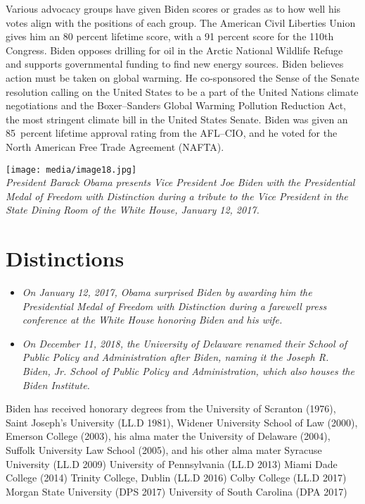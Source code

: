 Various advocacy groups have given Biden scores or grades as to how well
his votes align with the positions of each group. The American Civil
Liberties Union gives him an 80 percent lifetime score, with a 91
percent score for the 110th Congress. Biden opposes drilling for oil in
the Arctic National Wildlife Refuge and supports governmental funding to
find new energy sources. Biden believes action must be taken on global
warming. He co-sponsored the Sense of the Senate resolution calling on
the United States to be a part of the United Nations climate
negotiations and the Boxer--Sanders Global Warming Pollution Reduction
Act, the most stringent climate bill in the United States Senate. Biden
was given an 85~percent lifetime approval rating from the AFL--CIO, and
he voted for the North American Free Trade Agreement (NAFTA).

\texttt{[image: media/image18.jpg]}\\
\emph{President Barack Obama presents Vice President Joe Biden with the
Presidential Medal of Freedom with Distinction during a tribute to the
Vice President in the State Dining Room of the White House, January 12,
2017.}

\section{Distinctions}\label{distinctions}

\begin{itemize}
\item
  \emph{On January 12, 2017, Obama surprised Biden by awarding him the
  Presidential Medal of Freedom with Distinction during a farewell press
  conference at the White House honoring Biden and his wife.}
\item
  \emph{On December 11, 2018, the University of Delaware renamed their
  School of Public Policy and Administration after Biden, naming it the
  Joseph R. Biden, Jr. School of Public Policy and Administration, which
  also houses the Biden Institute.}
\end{itemize}

Biden has received honorary degrees from the University of Scranton
(1976), Saint Joseph's University (LL.D 1981), Widener University School
of Law (2000), Emerson College (2003), his alma mater the University of
Delaware (2004), Suffolk University Law School (2005), and his other
alma mater Syracuse University (LL.D 2009) University of Pennsylvania
(LL.D 2013) Miami Dade College (2014) Trinity College, Dublin (LL.D
2016) Colby College (LL.D 2017) Morgan State University (DPS 2017)
University of South Carolina (DPA 2017)

